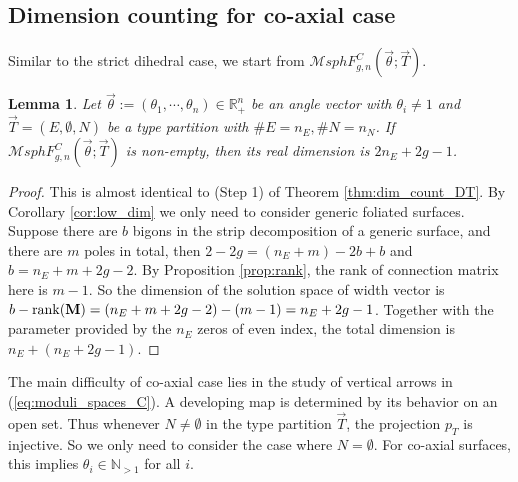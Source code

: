 \documentclass[pdflatex,sn-mathphys]{sn-jnl}%
\numberwithin{equation}{section}
\theoremstyle{thmstyleone}%
\newtheorem{lemma}[theorem]{Lemma}
\newcommand{\RR}{\mathbb{R}}
\newcommand{\NN}{\mathbb{N}}%
\newcommand{\MsphgnCFT}{\mathcal{M}sphF_{g,n}^C(\vec{\theta};\vec{T})}
\begin{document}
\subsection{Dimension counting for co-axial case}
Similar to the strict dihedral case, we start from $\MsphgnCFT$.
\begin{lemma}\label{lem:dim_count_CFT}
    Let $\vec{\theta}:=(\theta_1, \cdots, \theta_n) \in \RR^n_+$ be an angle vector with $\theta_i\neq1$ and $\vec{T}=( E, \emptyset, N )$ be a type partition with $ \#E=n_E, \#N=n_N $.
    If $\MsphgnCFT$ is non-empty, then its real dimension is 
    $ 2n_E+2g-1 $.
\end{lemma}
\begin{proof}
    This is almost identical to (Step 1) of Theorem \ref{thm:dim_count_DT}. By Corollary \ref{cor:low_dim} we only need to consider generic foliated surfaces. Suppose there are $b$ bigons in the strip decomposition of a generic surface, and there are $m$ poles in total, then $2-2g=(n_E+m)-2b+b$ and $b=n_E+m+2g-2$.
    By Proposition \ref{prop:rank}, the rank of connection matrix here is $m-1$. So the dimension of the solution space of width vector is $b-\mathrm{rank}(\mathbf{M}) = (n_E+m+2g-2)-(m-1) = n_E+2g-1$. Together with the parameter provided by the $n_E$ zeros of even index, the total dimension is $n_E+(n_E+2g-1)$.
\end{proof}

The main difficulty of co-axial case lies in the study of vertical arrows in (\ref{eq:moduli_spaces_C}).
A developing map is determined by its behavior on an open set. Thus whenever $N\neq \emptyset$ in the type partition $\vec{T}$, the projection $p_T$ is injective. So we only need to consider the case where $N=\emptyset$. For co-axial surfaces, this implies $\theta_i\in\NN_{>1}$ for all $i$. %
\end{document}

